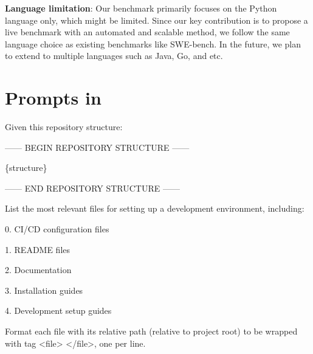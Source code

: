 \textbf{Language limitation}: Our benchmark \benchmark primarily focuses on the Python language only, which might be limited. Since our key contribution is to propose a live benchmark with an automated and scalable method, we follow the same language choice as  existing benchmarks like SWE-bench. In the future, we plan to extend \benchmark to multiple languages such as Java, Go, and etc.

\section{Prompts in \method{}}



\label{appdix:launchprompt}

\begin{tcolorbox}[colback=gray!5,colframe=black!50,fontupper=\ttfamily,title=Prompt for Relevant Files Identification]
Given this repository structure:

------ BEGIN REPOSITORY STRUCTURE ------

\{structure\}

------ END REPOSITORY STRUCTURE ------


List the most relevant files for setting up a development environment, including:

0. CI/CD configuration files

1. README files

2. Documentation

3. Installation guides

4. Development setup guides

Format each file with its relative path (relative to project root) to be wrapped with tag <file> </file>, one per line.
\end{tcolorbox}

